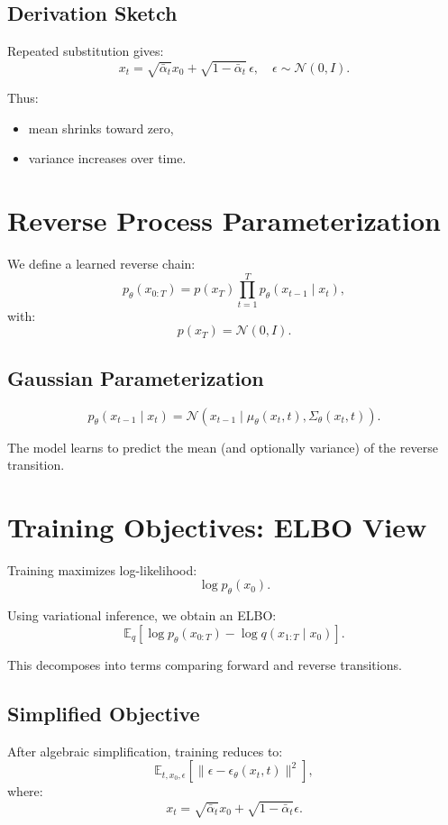 \subsection{Derivation Sketch}

Repeated substitution gives:
\[
x_t = \sqrt{\bar{\alpha}_t} x_0 + \sqrt{1-\bar{\alpha}_t}\,\epsilon,
\quad \epsilon \sim \mathcal{N}(0,I).
\]

Thus:
\begin{itemize}
    \item mean shrinks toward zero,
    \item variance increases over time.
\end{itemize}

\section{Reverse Process Parameterization}

We define a learned reverse chain:
\[
p_\theta(x_{0:T}) = p(x_T)\prod_{t=1}^T p_\theta(x_{t-1} \mid x_t),
\]
with:
\[
p(x_T) = \mathcal{N}(0,I).
\]

\subsection{Gaussian Parameterization}

\[
p_\theta(x_{t-1} \mid x_t)
=
\mathcal{N}(x_{t-1} \mid \mu_\theta(x_t,t), \Sigma_\theta(x_t,t)).
\]

The model learns to predict the mean (and optionally variance) of the reverse transition.

\section{Training Objectives: ELBO View}

Training maximizes log-likelihood:
\[
\log p_\theta(x_0).
\]

Using variational inference, we obtain an ELBO:
\[
\mathbb{E}_q \left[
\log p_\theta(x_{0:T}) - \log q(x_{1:T} \mid x_0)
\right].
\]

This decomposes into terms comparing forward and reverse transitions.

\subsection{Simplified Objective}

After algebraic simplification, training reduces to:
\[
\mathbb{E}_{t,x_0,\epsilon}
\left[
\| \epsilon - \epsilon_\theta(x_t,t) \|^2
\right],
\]
where:
\[
x_t = \sqrt{\bar{\alpha}_t}x_0 + \sqrt{1-\bar{\alpha}_t}\epsilon.
\]

